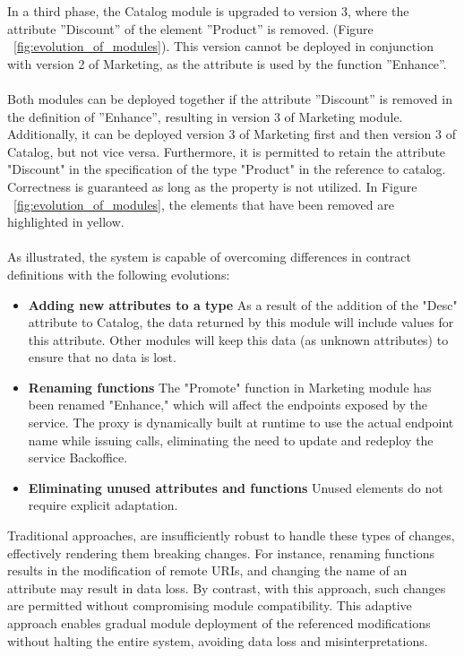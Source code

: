 In a third phase, the Catalog module is upgraded to version 3, where the attribute ''Discount'' of the element ''Product'' is removed.  (Figure ~\ref{fig:evolution_of_modules}).
This version cannot be deployed in conjunction with version 2 of Marketing, as the attribute is used by the function ''Enhance''.

\paragraph{}

Both modules can be deployed together if the attribute ''Discount'' is removed in the definition of ''Enhance'', resulting in version 3 of Marketing module.
Additionally, it can be deployed version 3 of Marketing first and then version 3 of Catalog, but not vice versa.
Furthermore, it is permitted to retain the attribute "Discount" in the specification of the type "Product" in the reference to catalog.
Correctness is guaranteed as long as the property is not utilized.
In Figure ~\ref{fig:evolution_of_modules}, the elements that have been removed are highlighted in yellow.

\paragraph{}

As illustrated,
the system is capable of overcoming differences in contract definitions with the following evolutions:

\begin{itemize}
    \item \textbf{Adding new attributes to a type} As a result of the addition of the "Desc" attribute to Catalog, the data returned by this module will include values for this attribute.
    Other modules will keep this data (as unknown attributes) to ensure that no data is lost.
    \item \textbf{Renaming functions} The "Promote" function in Marketing module has been renamed "Enhance," which will affect the endpoints exposed by the service.
    The proxy is dynamically built at runtime to use the actual endpoint name while issuing calls, eliminating the need to update and redeploy the service Backoffice.
    \item \textbf{Eliminating unused attributes and functions} Unused elements do not require explicit adaptation.
\end{itemize}

Traditional approaches, are insufficiently robust to handle these types of changes, effectively rendering them breaking changes.
For instance, renaming functions results in the modification of remote URIs, and changing the name of an attribute may result in data loss.
By contrast, with this approach, such changes are permitted without compromising module compatibility.
This adaptive approach enables gradual module deployment of the referenced modifications without halting the entire system, avoiding data loss and misinterpretations.

